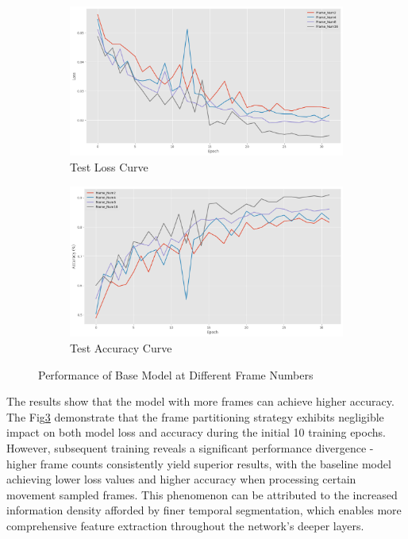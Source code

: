 \documentclass[conference]{IEEEtran}
\begin{document}
\begin{figure}[htbp]
    \begin{subfigure}[b]{0.24\textwidth}
        \centering
        \includegraphics[width=\textwidth]{figure/Test_loss.png}
        \caption{Test Loss Curve}
        \label{fig:sub3}
    \end{subfigure}
    \begin{subfigure}[b]{0.24\textwidth}
        \centering
        \includegraphics[width=\textwidth]{figure/Test_acc.png}
        \caption{Test Accuracy Curve}
        \label{fig:sub4}
    \end{subfigure}
    \caption{Performance of Base Model at Different Frame Numbers}
    \label{fig:main_figure}
\end{figure}
The results show that the model with more frames can achieve higher accuracy.
The Fig\ref{fig:main_figure} demonstrate that the frame partitioning strategy exhibits 
negligible impact on both model loss and accuracy during the initial 10 training epochs. 
However, subsequent training reveals a significant performance divergence - 
higher frame counts consistently yield superior results, 
with the baseline model achieving lower loss values and higher accuracy when processing certain movement sampled frames. 
This phenomenon can be attributed to the increased information density afforded by finer temporal segmentation, 
which enables more comprehensive feature extraction throughout the network's deeper layers.
\end{document}
